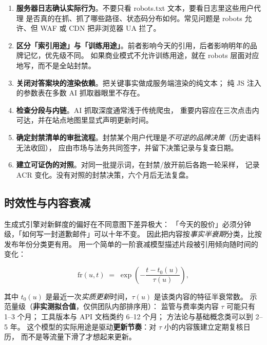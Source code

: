 \begin{toolbox}
\begin{enumerate}
  \item \textbf{服务器日志确认实际行为}。不要只看 robots.txt 文本，要看日志里这些用户代理
        是否真的在抓、抓了哪些路径、状态码分布如何。常见问题是 robots 允许、但 WAF 或 CDN 把非浏览器 UA 拦了。
  \item \textbf{区分「索引用途」与「训练用途」}。前者影响今天的引用，后者影响明年的品牌记忆，优先级不同。
        如果商业模式不允许训练用途，就在 robots 层面对应地写，而不是全站封禁。
  \item \textbf{关闭对答案块的渲染依赖}。把关键事实做成服务端渲染的纯文本；
        纯 JS 注入的参数表在多数 AI 抓取器眼里不存在。
  \item \textbf{检查分段与内链}。AI 抓取深度通常浅于传统爬虫，
        重要内容应在三次点击内可达，并在站点地图里显式声明更新时间。
  \item \textbf{确定封禁清单的审批流程}。封禁某个用户代理是\emph{不可逆的品牌决策}（历史语料无法收回），
        应由市场与法务共同签字，并留下决策记录与复查日期。
  \item \textbf{建立可证伪的对照}。对同一批提示词，在封禁/放开前后各跑一轮采样，
        记录 $\mathrm{ACR}$ 变化。没有对照的封禁决策，六个月后无法复盘。
\end{enumerate}
\end{toolbox}

\subsection{时效性与内容衰减}

生成式引擎对新鲜度的偏好在不同意图下差异极大：
「今天的股价」必须分钟级，「如何写一封道歉邮件」可以十年不变。
因此把内容按\emph{事实半衰期}分类，比按发布年份分类更有用。
用一个简单的一阶衰减模型描述片段被引用倾向随时间的变化：

\begin{equation}
\mathrm{fr}(u, t) \;=\; \exp\!\left(-\frac{t - t_0(u)}{\tau(u)}\right) ,
\label{eq:content-decay}
\end{equation}

其中 $t_0(u)$ 是最近一次\emph{实质更新}时间，$\tau(u)$ 是该类内容的特征半衰常数。
示范量级（\textbf{非实测拟合值}，仅供团队内部排序用）：
监管与费率类内容 $\tau$ 可能只有 1--3 个月；
工具版本与 API 文档类约 6--12 个月；
方法论与基础概念类可以到 2--5 年。
这个模型的实际用途是驱动\textbf{更新节奏}：对 $\tau$ 小的内容簇建立定期复核日历，
而不是等流量下滑了才想起来更新。

